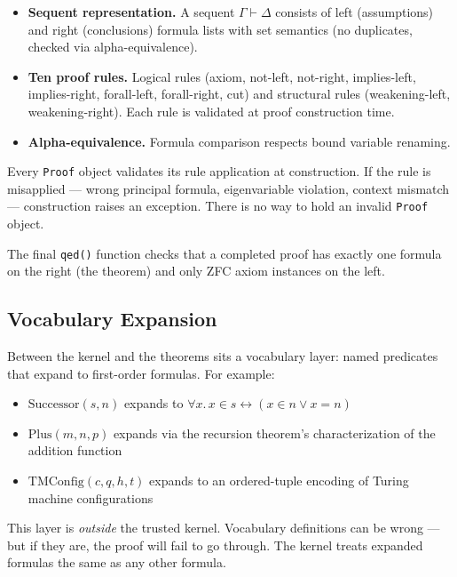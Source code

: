 \documentclass[letterpaper]{article}
\begin{document}
\begin{itemize}
  \item \textbf{Sequent representation.} A sequent $\Gamma \vdash \Delta$
    consists of left (assumptions) and right (conclusions) formula lists with
    set semantics (no duplicates, checked via alpha-equivalence).
  \item \textbf{Ten proof rules.} Logical rules (axiom, not-left,
    not-right, implies-left, implies-right, forall-left, forall-right, cut)
    and structural rules (weakening-left, weakening-right). Each rule is
    validated at proof construction time.
  \item \textbf{Alpha-equivalence.} Formula comparison respects bound variable
    renaming.
\end{itemize}

Every \texttt{Proof} object validates its rule application at construction.
If the rule is misapplied --- wrong principal formula, eigenvariable violation,
context mismatch --- construction raises an exception. There is no way to
hold an invalid \texttt{Proof} object.

The final \texttt{qed()} function checks that a completed proof has exactly
one formula on the right (the theorem) and only ZFC axiom instances on the
left.

\subsection{Vocabulary Expansion}
\label{sec:vocab}

Between the kernel and the theorems sits a vocabulary layer: named predicates
that expand to first-order formulas. For example:

\begin{itemize}
  \item $\text{Successor}(s, n)$ expands to
    $\forall x.\, x \in s \leftrightarrow (x \in n \lor x = n)$
  \item $\text{Plus}(m, n, p)$ expands via the recursion theorem's
    characterization of the addition function
  \item $\text{TMConfig}(c, q, h, t)$ expands to an ordered-tuple encoding
    of Turing machine configurations
\end{itemize}

This layer is \emph{outside} the trusted kernel. Vocabulary definitions can
be wrong --- but if they are, the proof will fail to go through. The kernel
treats expanded formulas the same as any other formula.
\end{document}
